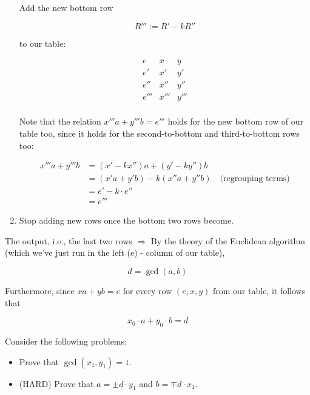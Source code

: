\documentclass[11pt]{article}
\begin{document}
\begin{enumerate}
          Add the new bottom row

          \[
              R''' := R' - k R''
          \]

          to our table:

          \[
              \begin{array}{c|c|c}
                  e    & x    & y    \\
                  \hline
                  e'   & x'   & y'   \\
                  e''  & x''  & y''  \\
                  e''' & x''' & y''' \\
              \end{array}
          \]

          Note that the relation \(x'''a + y'''b = e'''\) holds for the new bottom row of
          our table too, since it holds for the second-to-bottom and third-to-bottom rows
          too:

          \[
              \begin{aligned}
                  x'''a + y'''b & = (x' - kx'')a + (y' - ky'')b                                  \\
                                & = (x'a + y'b) - k(x''a + y''b) \quad \text{(regrouping terms)} \\
                                & = e' - k \cdot e''                                             \\
                                & = e'''
              \end{aligned}
          \]

    \item Stop adding new rows once the bottom two rows become.
\end{enumerate}

The output, i.e., the last two rows \(\Rightarrow\) By the theory of the
Euclidean algorithm (which we've just run in the left (e) - column of our
table),

\[
    d = \operatorname{gcd}(a, b)
\]

Furthermore, since \(xa + yb = e\) for every row \((e, x, y)\) from our table,
it follows that

\[
    x_0 \cdot a + y_0 \cdot b = d
\]

\begin{problem}
Consider the following problems:
\begin{itemize}
    \item Prove that \(\operatorname{gcd}(x_1, y_1) = 1\).
    \item (HARD) Prove that \(a = \pm d \cdot y_1\) and \(b = \mp d \cdot x_1\).
\end{itemize}
\end{problem}
\end{document}
